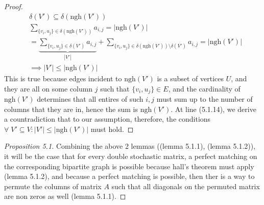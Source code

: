 \documentclass[]{article}
\theoremstyle{definition}
\begin{document}
\begin{proof}
            \begin{align}
                &
                \delta(V')\subseteq \delta(\text{ngh}(V'))
                \\&
                \sum_{\{v_i, u_j\} \in \delta(\text{ngh}(V'))}^{}
                    a_{i, j}
                = |\text{ngh}(V')|
                \\&
                =\underbrace{\sum_{\{v_i, u_j\} \in \delta(V') }^{} 
                a_{i, j}}_{|V'|} + 
                \sum_{
                    \{v_i, u_j\} \in 
                    \delta(\text{ngh}(V'))\setminus \delta(V')}^{}
                    a_{i, j}
                = |\text{ngh}(V')| 
                \\
                & 
                \implies |V'|\le |\text{ngh}(V')|
            \end{align}
            This is true because edges incident to $\text{ngh}(V')$ is a subset of vertices $U$, and they are all on some column $j$ such that $\{v_i, u_j\} \in E$, and the cardinality of $\text{ngh}(V')$ determines that all entires of such $i, j$ must sum up to the number of columns that they are in, hence the sum is $\text{ngh}(V')$. At line (5.1.14), we derive a countradiction that to our assumption, therefore, the conditions $\forall \;V' \subseteq V: |V'|\le |\text{ngh}(V')|$ must hold. 
            
        \end{proof}
        \begin{proof}[Proposition 5.1]
            Combining the above 2 lemmas ((lemma 5.1.1), (lemma 5.1.2)), it will be the case that for every double stochastic matrix, a perfect matching on the corresponding bipartite graph is possible because hall's theorem must apply (lemma 5.1.2), and because a perfect matching is possible, then ther is a way to permute the columns of matrix $A$ such that all diagonals on the permuted matrix are non zeros as well (lemma 5.1.1).     
        \end{proof}
        
\end{document}
